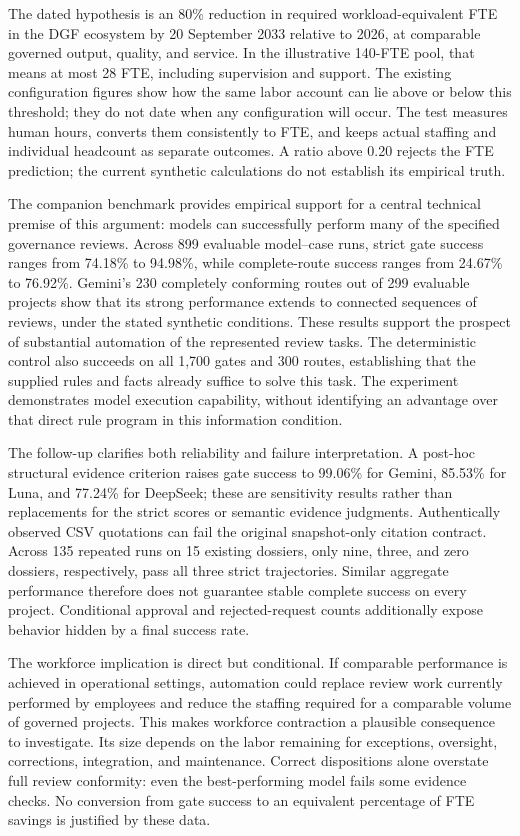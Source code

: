 The dated hypothesis is an 80\% reduction in required workload-equivalent FTE in the DGF ecosystem
by 20 September 2033 relative to 2026, at comparable governed output, quality, and service. In the
illustrative 140-FTE pool, that means at most 28 FTE, including supervision and support. The existing
configuration figures show how the same labor account can lie above or below this threshold; they do
not date when any configuration will occur. The test measures human hours, converts them consistently
to FTE, and keeps actual staffing and individual headcount as separate outcomes. A ratio above 0.20
rejects the FTE prediction; the current synthetic calculations do not establish its empirical truth.

The companion benchmark provides empirical support for a central technical premise of this
argument: models can successfully perform many of the specified governance reviews. Across 899
evaluable model--case runs, strict gate success ranges from 74.18\% to 94.98\%, while
complete-route success ranges from 24.67\% to 76.92\%. Gemini's 230 completely conforming
routes out of 299 evaluable projects show that its strong performance extends to connected
sequences of reviews, under the stated synthetic conditions. These results support the prospect
of substantial automation of the represented review tasks. The deterministic control also
succeeds on all 1,700 gates and 300 routes, establishing that the supplied rules and facts
already suffice to solve this task. The experiment demonstrates model execution capability,
without identifying an advantage over that direct rule program in this information condition.

The follow-up clarifies both reliability and failure interpretation. A post-hoc structural
evidence criterion raises gate success to 99.06\% for Gemini, 85.53\% for Luna, and 77.24\%
for DeepSeek; these are sensitivity results rather than replacements for the strict scores
or semantic evidence judgments. Authentically observed CSV quotations can fail the original
snapshot-only citation contract. Across 135 repeated runs on 15 existing dossiers, only nine,
three, and zero dossiers, respectively, pass all three strict trajectories. Similar aggregate
performance therefore does not guarantee stable complete success on every project. Conditional
approval and rejected-request counts additionally expose behavior hidden by a final success rate.

The workforce implication is direct but conditional. If comparable performance is achieved in
operational settings, automation could replace review work currently performed by employees
and reduce the staffing required for a comparable volume of governed projects. This makes
workforce contraction a plausible consequence to investigate. Its size depends on the labor
remaining for exceptions, oversight, corrections, integration, and maintenance. Correct
dispositions alone overstate full review conformity: even the best-performing model fails
some evidence checks. No conversion from gate success to an equivalent percentage of FTE
savings is justified by these data.

